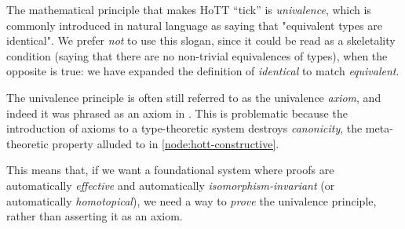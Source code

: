 \begin{node}
%
The mathematical principle that makes HoTT ``tick'' is
\emph{univalence}, which is commonly introduced in natural language as
saying that "equivalent types are identical". We prefer \emph{not} to
use this slogan, since it could be read as a skeletality condition
(saying that there are no non-trivial equivalences of types), when the
opposite is true: we have expanded the definition of \emph{identical} to
match \emph{equivalent}.

The univalence principle is often still referred to as the univalence
\emph{axiom}, and indeed it was phrased as an axiom in
\cite{UF:2013}.
 This is problematic
because the introduction of axioms to a type-theoretic system destroys
\emph{canonicity}, the meta-theoretic property alluded to in
\cref{node:hott-constructive}.

This means that, if we want a foundational system where proofs are
automatically \emph{effective} and automatically
\emph{isomorphism-invariant} (or automatically \emph{homotopical}), we
need a way to \emph{prove} the univalence principle, rather than
asserting it as an axiom.
%
\end{node}
